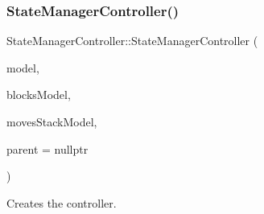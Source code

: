\subsubsection{\texorpdfstring{StateManagerController()}{StateManagerController()}}
{\footnotesize\ttfamily State\+Manager\+Controller\+::\+State\+Manager\+Controller (\begin{DoxyParamCaption}\item[{\mbox{\hyperlink{class_state_manager_model}{State\+Manager\+Model}} \&}]{model,  }\item[{\mbox{\hyperlink{class_blocks_model}{Blocks\+Model}} \&}]{blocks\+Model,  }\item[{\mbox{\hyperlink{class_move_stack_model}{Move\+Stack\+Model}} \&}]{moves\+Stack\+Model,  }\item[{Q\+Object $\ast$}]{parent = {\ttfamily nullptr} }\end{DoxyParamCaption})\hspace{0.3cm}{\ttfamily [explicit]}}



Creates the controller. 


